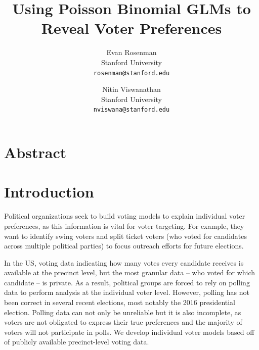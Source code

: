 \documentclass[10pt,twocolumn,letterpaper]{article}
\begin{document}
\title{Using Poisson Binomial GLMs to Reveal Voter Preferences}

\author{Evan Rosenman\\
Stanford University\\
{\tt\small rosenman@stanford.edu}
\and
Nitin Viswanathan\\
Stanford University\\
{\tt\small nviswana@stanford.edu}
}

\maketitle



\section{Abstract}

\section{Introduction}
Political organizations seek to build voting models to explain individual voter preferences, as this information is vital for voter targeting. For example, they want to identify swing voters and split ticket voters (who voted for candidates across multiple political parties) to focus outreach efforts for future elections.

In the US, voting data indicating how many votes every candidate receives is available at the precinct level, but the most granular data – who voted for which candidate – is private. As a result, political groups are forced to rely on polling data to perform analysis at the individual voter level. However, polling has not been correct in several recent elections, most notably the 2016 presidential election. Polling data can not only be unreliable but it is also incomplete, as voters are not obligated to express their true preferences and the majority of voters will not participate in polls. We develop individual voter models based off of publicly available precinct-level voting data.
\end{document}
